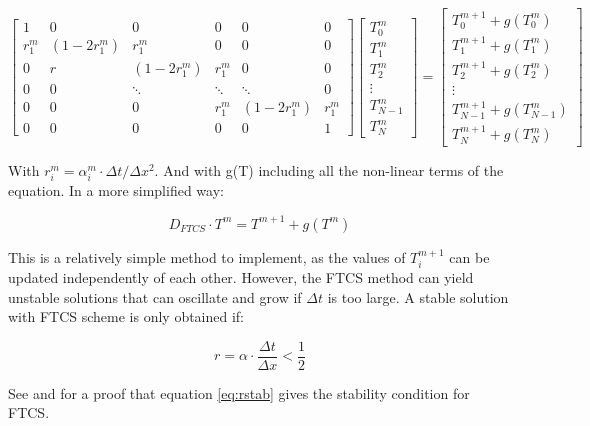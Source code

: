 $$
\begin{bmatrix}
         1 & 0 & 0 & 0 & 0 & 0 \\
         r^m_1 & \left(1-2r^m_1\right) & r^m_1 & 0 & 0 & 0 \\ 
         0 & r & \left(1-2r^m_1\right) & r^m_1 & 0 & 0 \\ 
         0 & 0 & \ddots & \ddots & \ddots & 0 \\
         0 & 0 & 0 & r^m_1 & \left(1-2r^m_1\right) & r^m_1 \\
         0 & 0 & 0 & 0 & 0 & 1 
     \end{bmatrix}
\begin{bmatrix}
         T^m_0  \\
         T^m_1 \\ 
         T^m_2  \\ 
         \vdots \\
         T^m_{N-1} \\
         T^m_N 
     \end{bmatrix}
     =
     \begin{bmatrix}
         T^{m+1}_0 + g(T^m_0) \\
         T^{m+1}_1 + g(T^m_1)\\ 
         T^{m+1}_2 + g(T^m_2)\\ 
         \vdots\\ 
         T^{m+1}_{N-1} + g(T^m_{N-1})\\
         T^{m+1}_{N} + g(T^m_{N}) 
     \end{bmatrix}
$$

With $r^m_i = \alpha^m_i \cdot \Delta t/ \Delta x^2$. And with g(T) including all the non-linear terms of the equation. In a more simplified way: 

\begin{equation}
    D_{FTCS}\cdot T^{m} = T^{m+1}+g(T^m)
\end{equation}

This is a relatively simple method to implement, as the values of $T_i^{m+1}$ can be updated independently of each other. However, the FTCS method can yield unstable solutions that can oscillate and grow if $\Delta t$ is too large. A stable solution with FTCS scheme is only obtained if: 

\begin{equation}
    r = \alpha\cdot \frac{\Delta t}{\Delta x} < \frac{1}{2}
    \label{eq:rstab}
\end{equation}

See \parencite[][]{ref:proveR1} and \parencite[][]{ref:proveR2} for a proof that equation \ref{eq:rstab} gives the stability condition for FTCS. 

